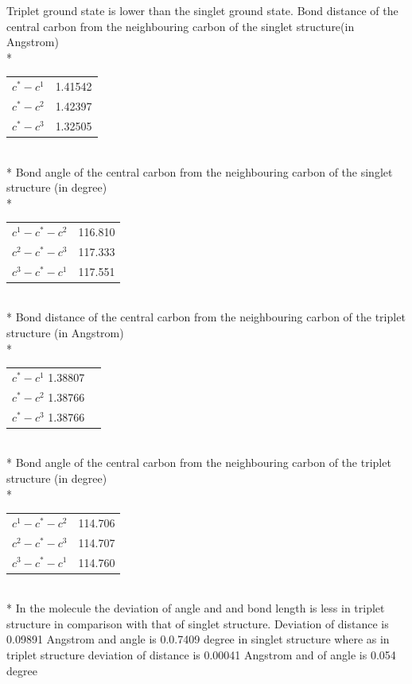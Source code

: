 \documentclass{article}
\begin{document}
Triplet ground state is lower than the singlet ground state.
Bond distance of the central carbon from the neighbouring carbon of the singlet structure(in Angstrom)\\*
\begin{tabular}{c c}
\(c^{*}-c^{1}\) & 1.41542 \\
\(c^{*}-c^{2}\) & 1.42397 \\
\(c^{*}-c^{3}\) & 1.32505\\
\end{tabular}\\*
Bond angle of the central carbon from the neighbouring carbon of the singlet structure (in degree)\\*
\begin{tabular}{c c}
\(c^{1}-c^{*}-c^{2}\) & 116.810\\
\(c^{2}-c^{*}-c^{3}\) & 117.333\\
\(c^{3}-c^{*}-c^{1}\) & 117.551\\
\end{tabular}\\*
Bond distance of the central carbon from the neighbouring carbon of the triplet structure (in Angstrom)\\*
\begin{tabular}{c c}
\(c^{*}-c^{1}\) 1.38807 \\
\(c^{*}-c^{2}\) 1.38766 \\
\(c^{*}-c^{3}\) 1.38766 \\
\end{tabular}\\*
Bond angle of the central carbon from the neighbouring carbon of the triplet structure (in degree)\\*
\begin{tabular}{c c}
\(c^{1}-c^{*}-c^{2}\) & 114.706 \\
\(c^{2}-c^{*}-c^{3}\) & 114.707 \\
\(c^{3}-c^{*}-c^{1}\) & 114.760\\
\end{tabular}\\*
In the molecule the deviation of angle and and bond length is less in triplet structure in comparison with that of singlet structure. 
Deviation of distance is 0.09891 Angstrom and angle is 0.0.7409 degree in singlet structure where as in triplet structure deviation of distance is 0.00041 Angstrom and of angle is 0.054 degree

\pagebreak
\end{document}
